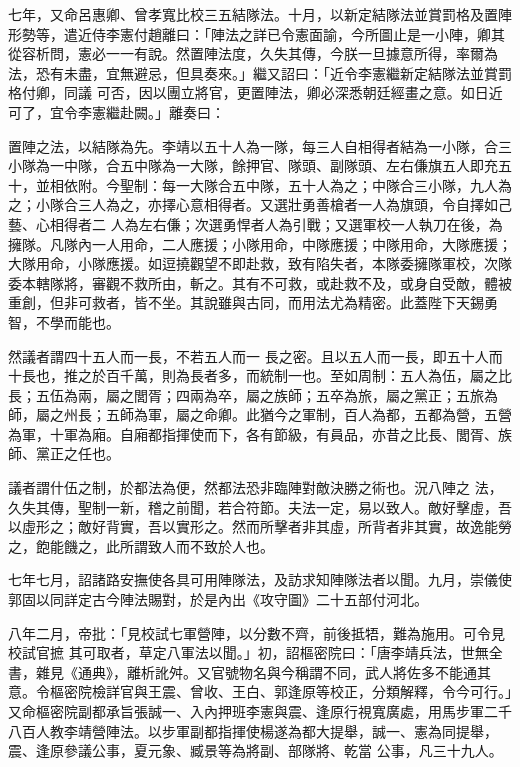 \begin{pinyinscope}
 七年，又命呂惠卿、曾孝寬比校三五結隊法。十月，以新定結隊法並賞罰格及置陣形勢等，遣近侍李憲付趙離曰：「陣法之詳已令憲面諭，今所圖止是一小陣，卿其從容析問，憲必一一有說。然置陣法度，久失其傳，今朕一旦據意所得，率爾為法，恐有未盡，宜無避忌，但具奏來。」繼又詔曰：「近令李憲繼新定結隊法並賞罰格付卿，同議
 可否，因以團立將官，更置陣法，卿必深悉朝廷經畫之意。如日近可了，宜令李憲繼赴闕。」離奏曰：



 置陣之法，以結隊為先。李靖以五十人為一隊，每三人自相得者結為一小隊，合三小隊為一中隊，合五中隊為一大隊，餘押官、隊頭、副隊頭、左右傔旗五人即充五十，並相依附。今聖制：每一大隊合五中隊，五十人為之；中隊合三小隊，九人為之；小隊合三人為之，亦擇心意相得者。又選壯勇善槍者一人為旗頭，令自擇如己藝、心相得者二
 人為左右傔；次選勇悍者人為引戰；又選軍校一人執刀在後，為擁隊。凡隊內一人用命，二人應援；小隊用命，中隊應援；中隊用命，大隊應援；大隊用命，小隊應援。如逗撓觀望不即赴救，致有陷失者，本隊委擁隊軍校，次隊委本轄隊將，審觀不救所由，斬之。其有不可救，或赴救不及，或身自受敵，體被重創，但非可救者，皆不坐。其說雖與古同，而用法尤為精密。此蓋陛下天錫勇智，不學而能也。



 然議者謂四十五人而一長，不若五人而一
 長之密。且以五人而一長，即五十人而十長也，推之於百千萬，則為長者多，而統制一也。至如周制：五人為伍，屬之比長；五伍為兩，屬之閭胥；四兩為卒，屬之族師；五卒為旅，屬之黨正；五旅為師，屬之州長；五師為軍，屬之命卿。此猶今之軍制，百人為都，五都為營，五營為軍，十軍為廂。自廂都指揮使而下，各有節級，有員品，亦昔之比長、閭胥、族師、黨正之任也。



 議者謂什伍之制，於都法為便，然都法恐非臨陣對敵決勝之術也。況八陣之
 法，久失其傳，聖制一新，稽之前聞，若合符節。夫法一定，易以致人。敵好擊虛，吾以虛形之；敵好背實，吾以實形之。然而所擊者非其虛，所背者非其實，故逸能勞之，飽能饑之，此所謂致人而不致於人也。



 七年七月，詔諸路安撫使各具可用陣隊法，及訪求知陣隊法者以聞。九月，崇儀使郭固以同詳定古今陣法賜對，於是內出《攻守圖》二十五部付河北。



 八年二月，帝批：「見校試七軍營陣，以分數不齊，前後抵牾，難為施用。可令見校試官摭
 其可取者，草定八軍法以聞。」初，詔樞密院曰：「唐李靖兵法，世無全書，雜見《通典》，離析訛舛。又官號物名與今稱謂不同，武人將佐多不能通其意。令樞密院檢詳官與王震、曾收、王白、郭逢原等校正，分類解釋，令今可行。」又命樞密院副都承旨張誠一、入內押班李憲與震、逢原行視寬廣處，用馬步軍二千八百人教李靖營陣法。以步軍副都指揮使楊遂為都大提舉，誠一、憲為同提舉，震、逢原參議公事，夏元象、臧景等為將副、部隊將、乾當
 公事，凡三十九人。




\end{pinyinscope}
